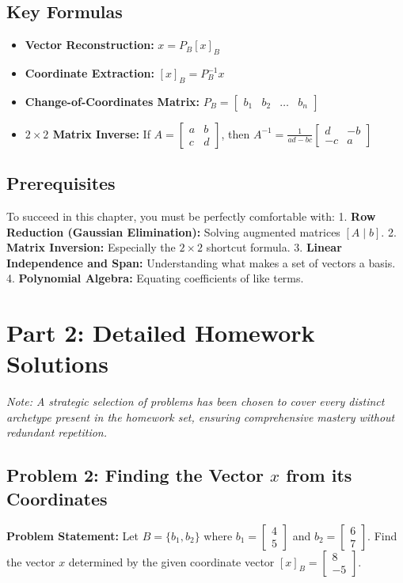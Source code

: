 \documentclass[11pt]{article}
\begin{document}
\subsection{Key Formulas}
\begin{itemize}
    \item \textbf{Vector Reconstruction:} $x = P_B [x]_B$
    \item \textbf{Coordinate Extraction:} $[x]_B = P_B^{-1} x$
    \item \textbf{Change-of-Coordinates Matrix:} $P_B = \begin{bmatrix} b_1 & b_2 & \dots & b_n \end{bmatrix}$
    \item \textbf{$2 \times 2$ Matrix Inverse:} If $A = \begin{bmatrix} a & b \\ c & d \end{bmatrix}$, then $A^{-1} = \frac{1}{ad-bc} \begin{bmatrix} d & -b \\ -c & a \end{bmatrix}$
\end{itemize}

\subsection{Prerequisites}
To succeed in this chapter, you must be perfectly comfortable with:
1. \textbf{Row Reduction (Gaussian Elimination):} Solving augmented matrices $[A \mid b]$.
2. \textbf{Matrix Inversion:} Especially the $2 \times 2$ shortcut formula.
3. \textbf{Linear Independence and Span:} Understanding what makes a set of vectors a basis.
4. \textbf{Polynomial Algebra:} Equating coefficients of like terms.

\newpage
\section{Part 2: Detailed Homework Solutions}

\textit{Note: A strategic selection of problems has been chosen to cover every distinct archetype present in the homework set, ensuring comprehensive mastery without redundant repetition.}

\subsection{Problem 2: Finding the Vector $x$ from its Coordinates}
\textbf{Problem Statement:} Let $B = \{b_1, b_2\}$ where $b_1 = \begin{bmatrix} 4 \\ 5 \end{bmatrix}$ and $b_2 = \begin{bmatrix} 6 \\ 7 \end{bmatrix}$. Find the vector $x$ determined by the given coordinate vector $[x]_B = \begin{bmatrix} 8 \\ -5 \end{bmatrix}$.
\end{document}
